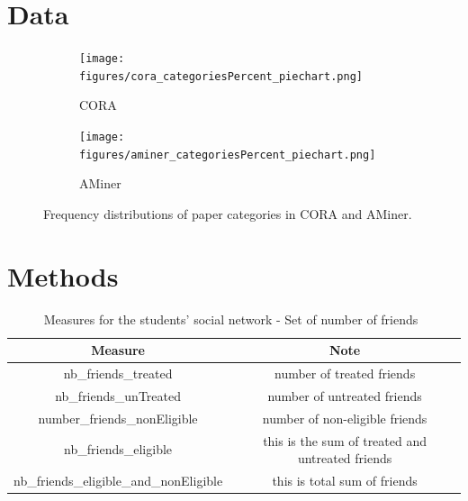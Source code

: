 \documentclass[11pt]{article}
\begin{document}
\section{Data\label{sec:data}}

\begin{figure}[H]
    \centering
    \begin{subfigure}[c]{.45\textwidth}
        \texttt{[image: figures/cora\_categoriesPercent\_piechart.png]}
        \caption{CORA}
        \label{fig:cora_catPercent}
    \end{subfigure}
    \begin{subfigure}[c]{.45\textwidth}
        \texttt{[image: figures/aminer\_categoriesPercent\_piechart.png]}
        \caption{AMiner}
        \label{fig:aminer_catPercent}
    \end{subfigure}
    \caption{Frequency distributions of paper categories in CORA and AMiner.}
    \label{fig:dataset_catPercent}
\end{figure}
\section{Methods\label{sec:research_design}}
\begin{table}[H]
    \centering
    \begin{tabular}{ c|c }
        \hline
        \textbf{Measure} & \textbf{Note} \\ \hline
        nb\_friends\_treated &  number of treated friends\\
        nb\_friends\_unTreated & number of untreated friends\\
        number\_friends\_nonEligible & number of non-eligible friends\\
        nb\_friends\_eligible & this is the sum of treated and untreated friends\\
        nb\_friends\_eligible\_and\_nonEligible & this is total sum of friends\\
        \hline
    \end{tabular}
    \caption{Measures for the students' social network - Set of number of friends~\cite{newman2010}}
    \label{table:social_network_measures_1}
\end{table}
\end{document}
